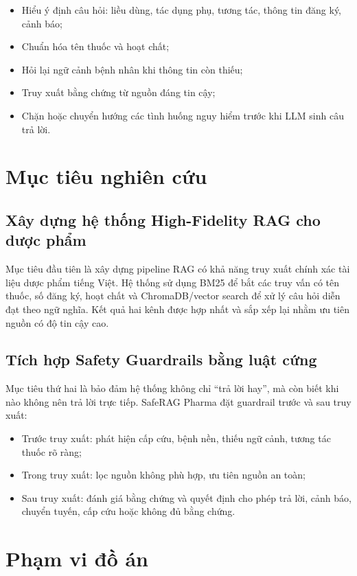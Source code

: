 \begin{itemize}
  \item Hiểu ý định câu hỏi: liều dùng, tác dụng phụ, tương tác, thông tin đăng ký, cảnh báo;
  \item Chuẩn hóa tên thuốc và hoạt chất;
  \item Hỏi lại ngữ cảnh bệnh nhân khi thông tin còn thiếu;
  \item Truy xuất bằng chứng từ nguồn đáng tin cậy;
  \item Chặn hoặc chuyển hướng các tình huống nguy hiểm trước khi LLM sinh câu trả lời.
\end{itemize}

\section{Mục tiêu nghiên cứu}

\subsection{Xây dựng hệ thống High-Fidelity RAG cho dược phẩm}

Mục tiêu đầu tiên là xây dựng pipeline RAG có khả năng truy xuất chính xác tài liệu dược phẩm tiếng Việt. Hệ thống sử dụng BM25 để bắt các truy vấn có tên thuốc, số đăng ký, hoạt chất và ChromaDB/vector search để xử lý câu hỏi diễn đạt theo ngữ nghĩa. Kết quả hai kênh được hợp nhất và sắp xếp lại nhằm ưu tiên nguồn có độ tin cậy cao.

\subsection{Tích hợp Safety Guardrails bằng luật cứng}

Mục tiêu thứ hai là bảo đảm hệ thống không chỉ ``trả lời hay'', mà còn biết khi nào không nên trả lời trực tiếp. SafeRAG Pharma đặt guardrail trước và sau truy xuất:

\begin{itemize}
  \item Trước truy xuất: phát hiện cấp cứu, bệnh nền, thiếu ngữ cảnh, tương tác thuốc rõ ràng;
  \item Trong truy xuất: lọc nguồn không phù hợp, ưu tiên nguồn an toàn;
  \item Sau truy xuất: đánh giá bằng chứng và quyết định cho phép trả lời, cảnh báo, chuyển tuyến, cấp cứu hoặc không đủ bằng chứng.
\end{itemize}

\section{Phạm vi đồ án}

